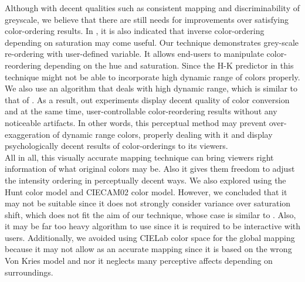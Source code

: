 \documentclass{article}
\begin{document}
 Although with decent qualities such as consistent mapping and discriminability of greyscale,  we believe that there are still needs for improvements over satisfying color-ordering results. In \cite{kim09_c2g}, it is also indicated that inverse color-ordering depending on saturation may come useful. Our technique demonstrates grey-scale re-ordering with user-defined variable. It allows end-users to manipulate color-reordering depending on the hue and saturation. Since the H-K predictor in this technique might not be able to incorporate high dynamic range of colors properly. We also use an algorithm that deals with high dynamic range, which is similar to that of \cite{journals/pr/GrundlandD07}. As a result, out experiments display decent quality of color conversion and at the same time, user-controllable color-reordering results without any noticeable artifacts. In other words, this perceptual method may prevent over-exaggeration of dynamic range colors, properly dealing with it and display psychologically decent results of color-orderings to its viewers. \\
 All in all, this visually accurate mapping technique can bring viewers right information of what original colors may be. Also it gives them freedom to adjust the intensity ordering in perceptually decent ways. We also explored using the Hunt color model \cite{Hunt} and CIECAM02 color model. However, we concluded that it may not be suitable since it does not strongly consider variance over saturation shift, which does not fit the aim of our technique, whose case is similar to \cite{Smith_apparentgreyscale}. Also, it may be far too heavy algorithm to use since it is required to be interactive with users. Additionally, we avoided using CIELab color space for the global mapping because it may not allow as an accurate mapping since it is based on the wrong Von Kries model and nor it neglects many perceptive affects depending on surroundings.\cite{Fairchild2004_1}
\end{document}
